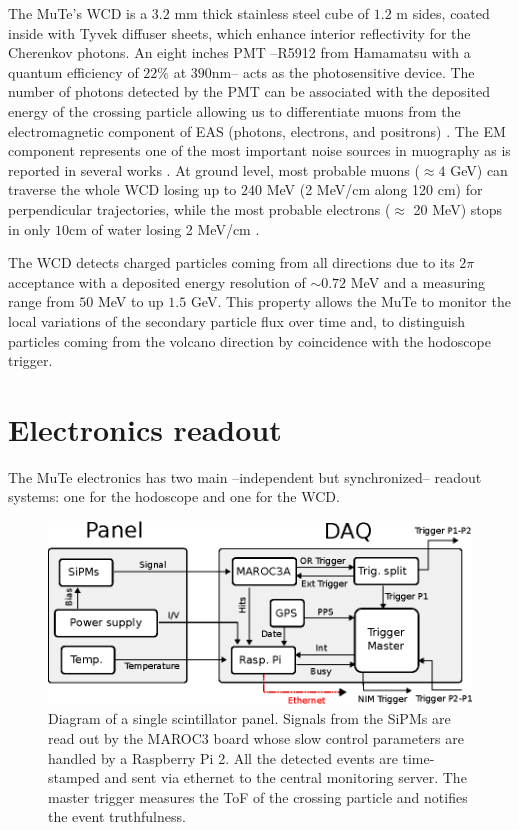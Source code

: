 \documentclass[letterpaper,11pt]{article}
\begin{document}
The MuTe's WCD is a $3.2$ mm thick stainless steel cube of $1.2$ m sides, coated inside with Tyvek diffuser sheets, which enhance interior reflectivity for the Cherenkov photons. An eight inches PMT --R5912 from Hamamatsu with a quantum efficiency of $22\%$ at $390$nm-- acts as the photosensitive device. The number of photons detected by the PMT can be associated with the deposited energy of the crossing particle allowing us to differentiate muons from the electromagnetic component of EAS (photons, electrons, and positrons) \cite{Billoir2014}. The EM component represents one of the most important noise sources in muography as is reported in several works \cite{KUSAGAYA2015, Nishiyama2014Noise, Marteau2012Noise}. At ground level, most probable muons ($\approx 4$ GeV) can traverse the whole WCD losing up to $240$ MeV (2 MeV/cm along 120 cm) for perpendicular trajectories, while the most probable electrons ($\approx$ 20 MeV) stops in only $10$cm of water losing 2 MeV/cm  \cite{groom2001muon,groom2000passage,lohmann1985energy,olive2014passage,Vasquez2018, Motta2018}.

The WCD detects charged particles coming from all directions due to its $2\pi$ acceptance with a deposited energy resolution of $\sim 0.72$ MeV and a measuring range from $50$ MeV to up $1.5$ GeV. This property allows the MuTe to monitor the local variations of the secondary particle flux over time \cite{Leon2018} and, to distinguish particles coming from the volcano direction by coincidence with the hodoscope trigger. 




\section{Electronics readout}
\label{daq}
The MuTe electronics has two main --independent but synchronized-- readout systems: one for the hodoscope and one for the WCD. 

\begin{figure}[htb]
\centering
\includegraphics[width=0.8\columnwidth]{Figures/DAQ.eps}
\caption{Diagram of a single scintillator panel. Signals from the SiPMs are read out by the MAROC3 board whose slow control parameters are handled by a Raspberry Pi 2. All the detected events are time-stamped and sent via ethernet to the central monitoring server. The master trigger measures the ToF of the crossing particle and notifies the event truthfulness.}
  \label{fig:scintillatordetector1}
\end{figure}
\end{document}
